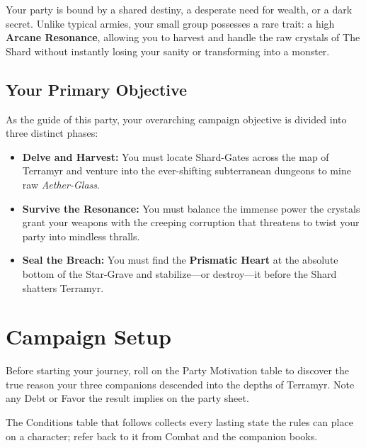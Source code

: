 Your party is bound by a shared destiny, a desperate need for wealth, or a dark secret. Unlike typical armies, your small group possesses a rare trait: a high \textbf{Arcane Resonance}, allowing you to harvest and handle the raw crystals of The Shard without instantly losing your sanity or transforming into a monster.

\subsection{Your Primary Objective}
As the guide of this party, your overarching campaign objective is divided into three distinct phases:
\begin{itemize}
    \item \textbf{Delve and Harvest:} You must locate Shard-Gates across the map of Terramyr and venture into the ever-shifting subterranean dungeons to mine raw \textit{Aether-Glass}.
    \item \textbf{Survive the Resonance:} You must balance the immense power the crystals grant your weapons with the creeping corruption that threatens to twist your party into mindless thralls.
    \item \textbf{Seal the Breach:} You must find the \textbf{Prismatic Heart} at the absolute bottom of the Star-Grave and stabilize—or destroy—it before the Shard shatters Terramyr.
\end{itemize}

\newpage

\section{Campaign Setup}
Before starting your journey, roll \dper{} on the Party Motivation table to discover the true reason your three companions descended into the depths of Terramyr. Note any Debt or Favor the result implies on the party sheet.

The Conditions table that follows collects every lasting state the rules can place on a character; refer back to it from Combat and the companion books.






